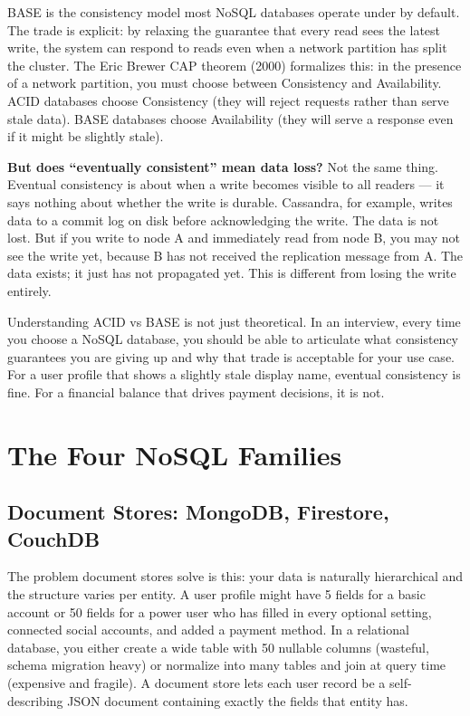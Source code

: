 \documentclass[11pt,a4paper]{article}
\begin{document}
BASE is the consistency model most NoSQL databases operate under by default. The trade is explicit: by relaxing the guarantee that every read sees the latest write, the system can respond to reads even when a network partition has split the cluster. The Eric Brewer CAP theorem (2000) formalizes this: in the presence of a network partition, you must choose between Consistency and Availability. ACID databases choose Consistency (they will reject requests rather than serve stale data). BASE databases choose Availability (they will serve a response even if it might be slightly stale).

\begin{thinkbox}
\textbf{But does ``eventually consistent'' mean data loss?} Not the same thing. Eventual consistency is about when a write becomes visible to all readers --- it says nothing about whether the write is durable. Cassandra, for example, writes data to a commit log on disk before acknowledging the write. The data is not lost. But if you write to node A and immediately read from node B, you may not see the write yet, because B has not received the replication message from A. The data exists; it just has not propagated yet. This is different from losing the write entirely.
\end{thinkbox}

Understanding ACID vs BASE is not just theoretical. In an interview, every time you choose a NoSQL database, you should be able to articulate what consistency guarantees you are giving up and why that trade is acceptable for your use case. For a user profile that shows a slightly stale display name, eventual consistency is fine. For a financial balance that drives payment decisions, it is not.

\section{The Four NoSQL Families}

\subsection{Document Stores: MongoDB, Firestore, CouchDB}

The problem document stores solve is this: your data is naturally hierarchical and the structure varies per entity. A user profile might have 5 fields for a basic account or 50 fields for a power user who has filled in every optional setting, connected social accounts, and added a payment method. In a relational database, you either create a wide table with 50 nullable columns (wasteful, schema migration heavy) or normalize into many tables and join at query time (expensive and fragile). A document store lets each user record be a self-describing JSON document containing exactly the fields that entity has.
\end{document}
